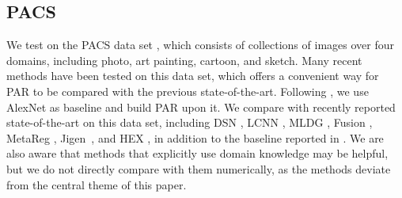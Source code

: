 \documentclass{article}
\begin{document}
\subsection{PACS}
We test on the PACS data set \citep{li2017deeper}, which consists of collections of images 
over four domains, including photo, art painting, cartoon, and sketch. Many recent methods have been tested on this data set, which offers a convenient way for PAR to be compared with the previous state-of-the-art. 
Following \citet{li2017deeper}, we use AlexNet as baseline and build PAR upon it. We compare with recently reported state-of-the-art on this data set, including DSN \citep{bousmalis2016domain}, LCNN \citep{li2017deeper}, MLDG \citep{li2017learning}, Fusion \citep{mancini2018best}, MetaReg \citep{NIPS2018_7378}, Jigen~\citep{Carlucci_2019_CVPR}, and HEX \citep{wang2018learning}, in addition to the baseline reported in \citep{li2017deeper}. 
We are also aware that methods that explicitly use domain knowledge \citep[\textit{e.g.},][]{lee2018simple} may be helpful, but we do not directly compare with them numerically, as the methods deviate from the central theme of this paper. 
\end{document}
